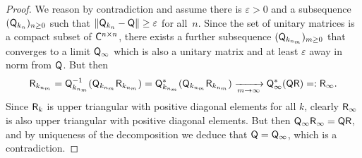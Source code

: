 \begin{proof}
    We reason by contradiction and assume
    there is $\varepsilon > 0$ and a subsequence $(\mathsf Q_{k_n})_{n\geq 0}$ such that $\lVert\mathsf Q_{k_n} - \mathsf Q\rVert \geq \varepsilon$ for all~$n$.
    Since the set of unitary matrices is a compact subset of $\mathsf C^{n \times n}$,
    there exists a further subsequence $(\mathsf Q_{k_{n_m}})_{m\geq 0}$ that converges to a limit $\mathsf Q_{\infty}$
    which is also a unitary matrix and at least $\varepsilon$ away in norm from $\mathsf Q$.
    But then
    \[
        \mathsf R_{k_{n_m}}
        = \mathsf Q_{k_{n_m}}^{-1} (\mathsf Q_{k_{n_m}} \mathsf R_{k_{n_m}})
        = \mathsf Q_{k_{n_m}}^* ( \mathsf Q_{k_{n_m}} \mathsf R_{k_{n_m}})
        \xrightarrow[m \to \infty]{} \mathsf Q_{\infty}^* (\mathsf Q \mathsf R) =: \mathsf R_{\infty}.
    \]
    Since $\mathsf R_k$ is upper triangular with positive diagonal elements for all $k$,
    clearly $\mathsf R_{\infty}$ is also upper triangular with positive diagonal elements.
    But then $\mathsf Q_{\infty} \mathsf R_{\infty} = \mathsf Q \mathsf R$,
    and by uniqueness of the decomposition we deduce that $\mathsf Q = \mathsf Q_{\infty}$,
    which is a contradiction.
\end{proof}

